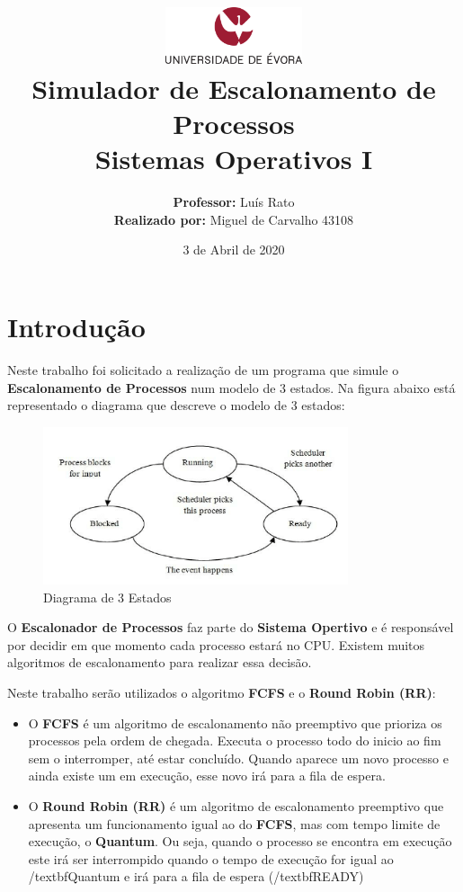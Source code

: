 \documentclass[11pt]{article}   %
\title
{
    \includegraphics[width=0.3\textwidth]{images/logo_universidade.png}
    \\[0.1cm]
    \textbf{Simulador de Escalonamento de Processos} \\
    Sistemas Operativos I
}
\author
{
    \textbf{Professor:} Luís Rato \\
    \textbf{Realizado por:} Miguel de Carvalho 43108 
}
\date{3 de Abril de 2020}
\begin{document}
\maketitle

\section{Introdução} 

\hspace{0,5cm}Neste trabalho foi solicitado a realização de um programa que simule o \textbf{Escalonamento de Processos} num modelo de 3 estados. Na figura abaixo está representado o diagrama que descreve o modelo de 3 estados:\par
\begin{figure}[h!]
    \begin{center}
        \includegraphics[width=0.8\textwidth]{images/states.png}
        \caption{Diagrama de 3 Estados}
    \end{center}
\end{figure}
O \textbf{Escalonador de Processos} faz parte do \textbf{Sistema Opertivo} e é responsável por decidir em que momento cada processo estará no CPU. 
Existem muitos algoritmos de escalonamento para realizar essa decisão. \par
\newpage
Neste trabalho serão utilizados o algoritmo \textbf{FCFS} e o \textbf{Round Robin (RR)}:
\begin{itemize}
    \item O \textbf{FCFS} é um algoritmo de escalonamento não preemptivo que prioriza os processos pela ordem de chegada. Executa o processo todo do inicio ao fim sem o interromper, até estar concluído. Quando aparece um novo processo e ainda existe um em execução, esse novo irá para a fila de espera.
    \item O \textbf{Round Robin (RR)} é um algoritmo de escalonamento preemptivo que apresenta um funcionamento igual ao do \textbf{FCFS}, mas com tempo limite de execução, o \textbf{Quantum}. Ou seja, quando o processo se encontra em execução este irá ser interrompido quando o tempo de execução for igual ao /textbf{Quantum} e irá para a fila de espera (/textbf{READY}) 
\end{itemize}
\end{document}
